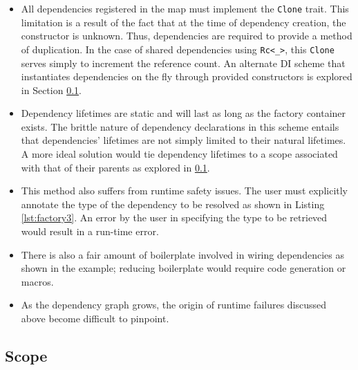 \documentclass[sigconf]{acmart}
\begin{document}
\begin{itemize}
\item All dependencies registered in the map must implement the \lstinline{Clone} trait. This limitation is a result of the fact that at the time of dependency creation, the constructor is unknown. Thus, dependencies are required to provide a method of duplication. In the case of shared dependencies using \lstinline{Rc<_>}, this \lstinline{Clone} serves simply to increment the reference count. An alternate DI scheme that instantiates dependencies on the fly through provided constructors is explored in Section \ref{scope}.
\item Dependency lifetimes are static and will last as long as the factory container exists. The brittle nature of dependency declarations in this scheme entails that dependencies' lifetimes are not simply limited to their natural lifetimes. A more ideal solution would tie dependency lifetimes to a scope associated with that of their parents as explored in \ref{scope}.
\item This method also suffers from runtime safety issues. The user must explicitly annotate the type of the dependency to be resolved as shown in Listing \ref{lst:factory3}. An error by the user in specifying the type to be retrieved would result in a run-time error.
\item There is also a fair amount of boilerplate involved in wiring dependencies as shown in the example; reducing boilerplate would require code generation or macros.
\item As the dependency graph grows, the origin of runtime failures discussed above become difficult to pinpoint.
\end{itemize}

\begin{minipage}{\linewidth}

\end{minipage}

\begin{minipage}{\linewidth}

\end{minipage}

\subsection{Scope} \label{scope}
\end{document}
